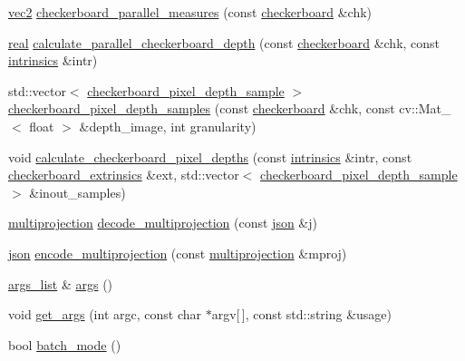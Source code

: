 \begin{DoxyCompactItemize}
\item 
\hyperlink{namespacetlz_ae192989bfbe6c700ac84d2a8cf05ebb4}{vec2} \hyperlink{namespacetlz_a492777e414b1a5103f074696c2385c9e}{checkerboard\+\_\+parallel\+\_\+measures} (const \hyperlink{structtlz_1_1checkerboard}{checkerboard} \&chk)
\item 
\hyperlink{namespacetlz_a15fd37cce97f2b8b606af18c2615f602}{real} \hyperlink{namespacetlz_a53bbde5568ab51896f6c4c2730d91256}{calculate\+\_\+parallel\+\_\+checkerboard\+\_\+depth} (const \hyperlink{structtlz_1_1checkerboard}{checkerboard} \&chk, const \hyperlink{structtlz_1_1intrinsics}{intrinsics} \&intr)
\item 
std\+::vector$<$ \hyperlink{structtlz_1_1checkerboard__pixel__depth__sample}{checkerboard\+\_\+pixel\+\_\+depth\+\_\+sample} $>$ \hyperlink{namespacetlz_a48aea98fe42d152179154953ece9b366}{checkerboard\+\_\+pixel\+\_\+depth\+\_\+samples} (const \hyperlink{structtlz_1_1checkerboard}{checkerboard} \&chk, const cv\+::\+Mat\+\_\+$<$ float $>$ \&depth\+\_\+image, int granularity)
\item 
void \hyperlink{namespacetlz_a14afc7fea76a0b1ef43be4abfcdb97e4}{calculate\+\_\+checkerboard\+\_\+pixel\+\_\+depths} (const \hyperlink{structtlz_1_1intrinsics}{intrinsics} \&intr, const \hyperlink{structtlz_1_1checkerboard__extrinsics}{checkerboard\+\_\+extrinsics} \&ext, std\+::vector$<$ \hyperlink{structtlz_1_1checkerboard__pixel__depth__sample}{checkerboard\+\_\+pixel\+\_\+depth\+\_\+sample} $>$ \&inout\+\_\+samples)
\item 
\hyperlink{classtlz_1_1multiprojection}{multiprojection} \hyperlink{namespacetlz_a272baad17817edf09b7ef609fd5f823c}{decode\+\_\+multiprojection} (const \hyperlink{namespacetlz_ac400657dfcddf6309a769aefc23eed0c}{json} \&j)
\item 
\hyperlink{namespacetlz_ac400657dfcddf6309a769aefc23eed0c}{json} \hyperlink{namespacetlz_a705c07f764f8b85d36c0cd04d18db67d}{encode\+\_\+multiprojection} (const \hyperlink{classtlz_1_1multiprojection}{multiprojection} \&mproj)
\item 
\hyperlink{classtlz_1_1args__list}{args\+\_\+list} \& \hyperlink{namespacetlz_a780431daab8d2595372eacb43143b52d}{args} ()
\item 
void \hyperlink{namespacetlz_a3c03f5d9d6261ec2909938822fc47f8a}{get\+\_\+args} (int argc, const char $\ast$argv\mbox{[}$\,$\mbox{]}, const std\+::string \&usage)
\item 
bool \hyperlink{namespacetlz_a79475d699e46e6ec068d88a9c0563b4b}{batch\+\_\+mode} ()
\item 

\end{DoxyCompactItemize}

